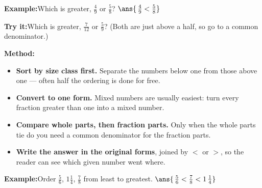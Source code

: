 \documentclass[12pt]{article}
\begin{document}
\begin{examplebox}
\textbf{Example:}\quad Which is greater, $\tfrac{4}{9}$ or $\tfrac{5}{8}$?
$\ans{\,\tfrac{4}{9} < \tfrac{5}{8}}$
\end{examplebox}

\begin{tryitbox}
\textbf{Try it:}\quad Which is greater, $\tfrac{7}{12}$ or $\tfrac{5}{9}$?
(Both are just above a half, so go to a common denominator.)\\[2pt]
\end{tryitbox}


\begin{formulabox}
\textbf{Method:}
\begin{itemize}[leftmargin=0.8cm, itemsep=1pt, topsep=1pt]
  \item \textbf{Sort by size class first.} Separate the numbers below one from
        those above one --- often half the ordering is done for free.
  \item \textbf{Convert to one form.} Mixed numbers are usually easiest: turn
        every fraction greater than one into a mixed number.
  \item \textbf{Compare whole parts, then fraction parts.} Only when the whole
        parts tie do you need a common denominator for the fraction parts.
  \item \textbf{Write the answer in the original forms}, joined by $<$ or $>$,
        so the reader can see which given number went where.
\end{itemize}
\end{formulabox}

\begin{examplebox}
\textbf{Example:}\quad Order $\tfrac{5}{6}$, $1\tfrac{1}{4}$, $\tfrac{7}{8}$
from least to greatest.
$\ans{\,\tfrac{5}{6} < \tfrac{7}{8} < 1\,\tfrac{1}{4}}$
\end{examplebox}
\end{document}
